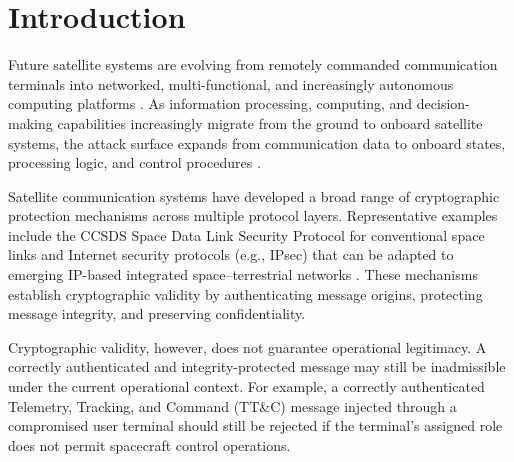 \documentclass[journal]{IEEEtran}
\begin{document}
\maketitle

\begin{abstract}
XXXX
\end{abstract}

 

\section{Introduction} %
\label{sec:Intro}
Future satellite systems are evolving from remotely commanded communication terminals into networked, multi-functional, and increasingly autonomous computing platforms \cite{kodheli2020satellite}. 
As information processing, computing, and decision-making capabilities increasingly migrate from the ground to onboard satellite systems, the attack surface expands from communication data to onboard states, processing logic, and control procedures
\cite{thangavel2024artificial}. 

Satellite communication systems have developed a broad range of cryptographic protection mechanisms across multiple protocol layers. Representative examples include the CCSDS Space Data Link Security Protocol \cite{ccsds2022sdls} for conventional space links and Internet security protocols (e.g., IPsec) that can be adapted to emerging IP-based integrated space--terrestrial networks \cite{ahmad2022security}. 
These mechanisms establish cryptographic validity by authenticating message origins, protecting message integrity, and preserving confidentiality.

Cryptographic validity, however, does not guarantee operational legitimacy.
A correctly authenticated and integrity-protected message may still be inadmissible under the current operational context.
For example, a correctly authenticated Telemetry, Tracking, and Command (TT\&C) message injected through a compromised user terminal should still be rejected if the terminal's assigned role does not permit spacecraft control operations.
\end{document}
